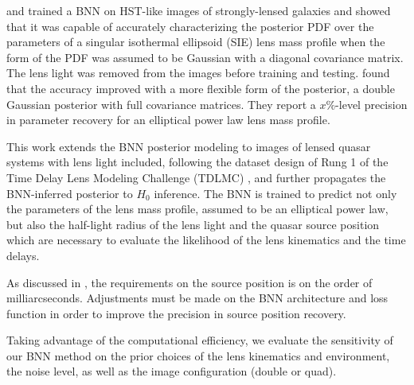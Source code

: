 \cite{hezaveh2017fast} and \cite{levasseur2017uncertainties} trained a BNN on HST-like images of strongly-lensed galaxies and showed that it was capable of accurately characterizing the posterior PDF over the parameters of a singular isothermal ellipsoid (SIE) lens mass profile when the form of the PDF was assumed to be Gaussian with a diagonal covariance matrix. The lens light was removed from the images before training and testing. \cite{wagnercarena2019double} found that the accuracy improved with a more flexible form of the posterior, a double Gaussian posterior with full covariance matrices. They report a $x \%$-level precision in parameter recovery for an elliptical power law lens mass profile.



This work extends the BNN posterior modeling to images of lensed quasar systems with lens light included, following the dataset design of Rung 1 of the Time Delay Lens Modeling Challenge (TDLMC) \cite{ding2018time}, and further propagates the BNN-inferred posterior to $H_0$ inference. The BNN is trained to predict not only the parameters of the lens mass profile, assumed to be an elliptical power law, but also the half-light radius of the lens light and the quasar source position which are necessary to evaluate the likelihood of the lens kinematics and the time delays.

As discussed in \cite{birrer2019astrometric}, the requirements on the source position is on the order of milliarcseconds. Adjustments must be made on the BNN architecture and loss function in order to improve the precision in source position recovery.

Taking advantage of the computational efficiency, we evaluate the sensitivity of our BNN method on the prior choices of the lens kinematics and environment, the noise level, as well as the image configuration (double or quad).